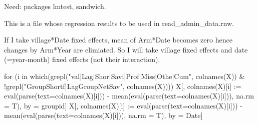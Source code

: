 \setcounter{tocdepth}{3}
\tableofcontents
\newpage

\setlength{\parindent}{1em}
\vspace{2ex}

Need: packages \textsf{lmtest, sandwich}.

This is a file whose regression results to be used in read\_admin\_data.rnw.







If I take village*Date fixed effects, mean of Arm*Date becomes zero hence changes by Arm*Year are elimiated. So I will take village fixed effects and date (=year-month) fixed effects (not their interaction).
\begin{Schunk}
\begin{Sinput}
for (i in which(grepl("val|Lag|Shor|Savi|Prof|Miss|Othe|Cum", colnames(X)) & 
 !grepl("GroupShortf|LagGroupNetSav", colnames(X)))) {
  X[, colnames(X)[i] := eval(parse(text=colnames(X)[i])) - 
    mean(eval(parse(text=colnames(X)[i])), na.rm = T), 
    by = groupid]
  X[, colnames(X)[i] := eval(parse(text=colnames(X)[i])) - 
    mean(eval(parse(text=colnames(X)[i])), na.rm = T), 
    by = Date]
}
\end{Sinput}
\end{Schunk}
